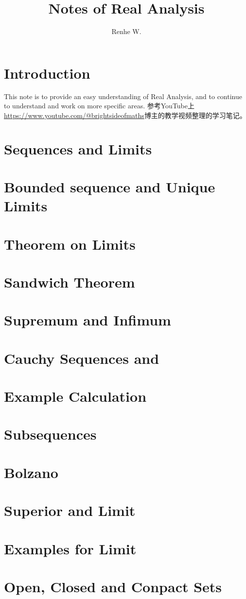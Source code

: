 \documentclass[UTF8,12pt]{ctexart}
\title{Notes of Real Analysis}
\author{Renhe W.}
\date{ }
\numberwithin{equation}{section}%
\begin{document}
	\maketitle
	\tableofcontents
	\kaishu
	\section{Introduction}
	This note is to provide an easy understanding of Real Analysis, and to continue to understand and work on more specific areas. 参考YouTube上\url{https://www.youtube.com/@brightsideofmaths}博主的教学视频整理的学习笔记。
	
	\section{Sequences and Limits}
	
	\section{Bounded sequence and Unique Limits}
	
	\section{Theorem on Limits}
	
	\section{Sandwich Theorem}
	
	\section{Supremum and Infimum}
	
	\section{Cauchy Sequences and}
	
	\section{Example Calculation}
	
	\section{Subsequences}
	
	\section{Bolzano}
	
	\section{Superior and Limit}
	
	\section{Examples for Limit}
	
	\section{Open, Closed and Conpact Sets}
	
	
\end{document}

